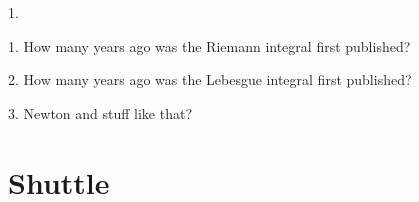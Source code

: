 \documentclass{article}
\begin{document}
1. %



1. How many years ago was the Riemann integral first published? 


2. How many years ago was the Lebesgue integral first published?

3. Newton and stuff like that? 










\section{Shuttle}


\end{document}
